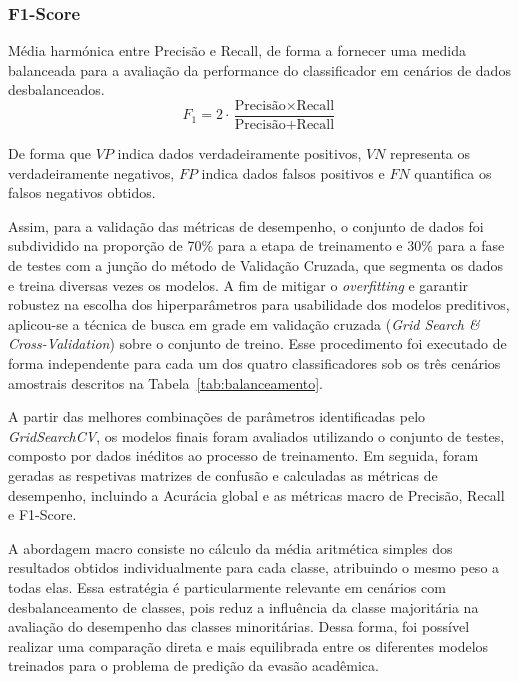 \subsubsection{F1-Score}
Média harmónica entre Precisão e Recall, de forma a fornecer uma medida balanceada para a avaliação da performance do classificador em cenários de dados desbalanceados.
\begin{equation}
F_1 = 2 \cdot \frac{\text{Precisão} \times \text{Recall}} {\text{Precisão} + \text{Recall}}
\label{eq:f1}
\end{equation}

De forma que $VP$ indica dados verdadeiramente positivos, $VN$ representa os verdadeiramente negativos, $FP$ indica dados falsos positivos e $FN$ quantifica os falsos negativos obtidos.

Assim, para a validação das métricas de desempenho, o conjunto de dados foi subdividido na proporção de 70\% para a etapa de treinamento e 30\% para a fase de testes com a junção do método de Validação Cruzada, que segmenta os dados e treina diversas vezes os modelos. A fim de mitigar o \textit{overfitting} e garantir robustez na escolha dos hiperparâmetros para usabilidade dos modelos preditivos, aplicou-se a técnica de busca em grade em validação cruzada (\textit{Grid Search \& Cross-Validation}) sobre o conjunto de treino. Esse procedimento foi executado de forma independente para cada um dos quatro classificadores sob os três cenários amostrais descritos na Tabela~\ref{tab:balanceamento}.

A partir das melhores combinações de parâmetros identificadas pelo \textit{GridSearchCV}, os modelos finais foram avaliados utilizando o conjunto de testes, composto por dados inéditos ao processo de treinamento. Em seguida, foram geradas as respetivas matrizes de confusão e calculadas as métricas de desempenho, incluindo a Acurácia global e as métricas macro de Precisão, Recall e F1-Score. 

A abordagem macro consiste no cálculo da média aritmética simples dos resultados obtidos individualmente para cada classe, atribuindo o mesmo peso a todas elas. Essa estratégia é particularmente relevante em cenários com desbalanceamento de classes, pois reduz a influência da classe majoritária na avaliação do desempenho das classes minoritárias. Dessa forma, foi possível realizar uma comparação direta e mais equilibrada entre os diferentes modelos treinados para o problema de predição da evasão acadêmica.
